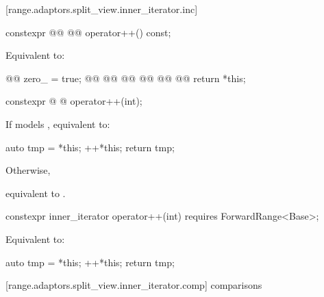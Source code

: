 {[range.adaptors.split_view.inner_iterator.inc]{}

%
\begin{itemdecl}
constexpr @@ @@ operator++() const;
\end{itemdecl}

\begin{itemdescr}
\pnum
\effects Equivalent to:
\begin{codeblock}
@@
zero_ = true;
@@
  @@
    @@
  @\newtxt{\}}@
@\newtxt{\}}@
@@
return *this;
\end{codeblock}
\end{itemdescr}

%
\begin{itemdecl}
constexpr @ @ operator++(int);
\end{itemdecl}

\begin{itemdescr}
\pnum
\effects
{\color{newclr}
If  models , equivalent to:
\begin{codeblock}
auto tmp = *this;
++*this;
return tmp;
\end{codeblock}
Otherwise,
} %
equivalent to .
\end{itemdescr}

{\color{oldclr}
%
\begin{itemdecl}
constexpr inner_iterator operator++(int) requires ForwardRange<Base>;
\end{itemdecl}

\begin{itemdescr}
\pnum
\effects Equivalent to:
\begin{codeblock}
auto tmp = *this;
++*this;
return tmp;
\end{codeblock}
\end{itemdescr}
} %

[range.adaptors.split_view.inner_iterator.comp]{ comparisons}

}
